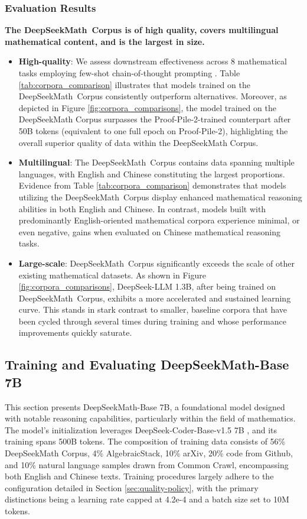 \begin{itemize}[topsep=0pt]
\subsubsection{Evaluation Results}

\textbf{The DeepSeekMath~Corpus is of high quality, covers multilingual mathematical content, and is the largest in size.}

\begin{itemize}[topsep=0pt]
    \item \textbf{High-quality}:
    We assess downstream effectiveness across 8 mathematical tasks employing few-shot chain-of-thought prompting \cite{cot}. Table \ref{tab:corpora_comparison} illustrates that models trained on the DeepSeekMath~Corpus consistently outperform alternatives. Moreover, as depicted in Figure \ref{fig:corpora_comparisons}, the model trained on the DeepSeekMath Corpus surpasses the Proof-Pile-2-trained counterpart after 50B tokens (equivalent to one full epoch on Proof-Pile-2), highlighting the overall superior quality of data within the DeepSeekMath Corpus.
    \item \textbf{Multilingual}:
    The DeepSeekMath~Corpus contains data spanning multiple languages, with English and Chinese constituting the largest proportions. Evidence from Table \ref{tab:corpora_comparison} demonstrates that models utilizing the DeepSeekMath~Corpus display enhanced mathematical reasoning abilities in both English and Chinese. In contrast, models built with predominantly English-oriented mathematical corpora experience minimal, or even negative, gains when evaluated on Chinese mathematical reasoning tasks.
    \item \textbf{Large-scale}:
    DeepSeekMath~Corpus significantly exceeds the scale of other existing mathematical datasets. As shown in Figure \ref{fig:corpora_comparisons}, DeepSeek-LLM 1.3B, after being trained on DeepSeekMath~Corpus, exhibits a more accelerated and sustained learning curve. This stands in stark contrast to smaller, baseline corpora that have been cycled through several times during training and whose performance improvements quickly saturate.
\end{itemize}

\subsection{Training and Evaluating DeepSeekMath-Base 7B}

This section presents DeepSeekMath-Base 7B, a foundational model designed with notable reasoning capabilities, particularly within the field of mathematics. The model’s initialization leverages DeepSeek-Coder-Base-v1.5 7B \citep{deepseek-coder}, and its training spans 500B tokens. The composition of training data consists of 56\% DeepSeekMath Corpus, 4\% AlgebraicStack, 10\% arXiv, 20\% code from Github, and 10\% natural language samples drawn from Common Crawl, encompassing both English and Chinese texts. Training procedures largely adhere to the configuration detailed in Section \ref{sec:quality-policy}, with the primary distinctions being a learning rate capped at 4.2e-4 and a batch size set to 10M tokens.


\end{itemize}
